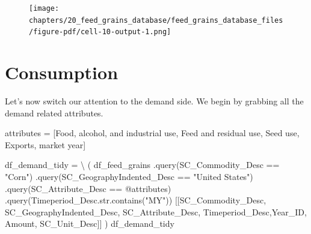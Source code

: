\documentclass[
  letterpaper,
  DIV=11,
  numbers=noendperiod]{scrreprt}
\newenvironment{Shaded}{\begin{snugshade}}{\end{snugshade}}
\newcommand{\NormalTok}[1]{\textcolor[rgb]{0.00,0.23,0.31}{#1}}
\newcommand{\OperatorTok}[1]{\textcolor[rgb]{0.37,0.37,0.37}{#1}}
\newcommand{\StringTok}[1]{\textcolor[rgb]{0.13,0.47,0.30}{#1}}
\begin{document}
\begin{figure}[H]

{\centering \texttt{[image: chapters/20\_feed\_grains\_database/feed\_grains\_database\_files/figure-pdf/cell-10-output-1.png]}

}

\end{figure}

\hypertarget{consumption}{%
\section{Consumption}\label{consumption}}

Let's now switch our attention to the demand side. We begin by grabbing
all the demand related attributes.

\begin{Shaded}
\begin{Highlighting}[]
\NormalTok{attributes }\OperatorTok{=}\NormalTok{ [}\StringTok{\textquotesingle{}Food, alcohol, and industrial use\textquotesingle{}}\NormalTok{, }\StringTok{\textquotesingle{}Feed and residual use\textquotesingle{}}\NormalTok{, }\StringTok{\textquotesingle{}Seed use\textquotesingle{}}\NormalTok{, }\StringTok{\textquotesingle{}Exports, market year\textquotesingle{}}\NormalTok{]}

\NormalTok{df\_demand\_tidy }\OperatorTok{=} \OperatorTok{\textbackslash{}}
\NormalTok{    (}
\NormalTok{    df\_feed\_grains}
\NormalTok{        .query(}\StringTok{\textquotesingle{}SC\_Commodity\_Desc == "Corn"\textquotesingle{}}\NormalTok{)}
\NormalTok{        .query(}\StringTok{\textquotesingle{}SC\_GeographyIndented\_Desc == "United States"\textquotesingle{}}\NormalTok{)}
\NormalTok{        .query(}\StringTok{\textquotesingle{}SC\_Attribute\_Desc == @attributes\textquotesingle{}}\NormalTok{)}
\NormalTok{        .query(}\StringTok{\textquotesingle{}Timeperiod\_Desc.str.contains("MY")\textquotesingle{}}\NormalTok{)}
\NormalTok{        [[}\StringTok{\textquotesingle{}SC\_Commodity\_Desc\textquotesingle{}}\NormalTok{, }\StringTok{\textquotesingle{}SC\_GeographyIndented\_Desc\textquotesingle{}}\NormalTok{, }\StringTok{\textquotesingle{}SC\_Attribute\_Desc\textquotesingle{}}\NormalTok{, }\StringTok{\textquotesingle{}Timeperiod\_Desc\textquotesingle{}}\NormalTok{,}\StringTok{\textquotesingle{}Year\_ID\textquotesingle{}}\NormalTok{, }\StringTok{\textquotesingle{}Amount\textquotesingle{}}\NormalTok{, }\StringTok{\textquotesingle{}SC\_Unit\_Desc\textquotesingle{}}\NormalTok{]]}
\NormalTok{    )}
\NormalTok{df\_demand\_tidy}
\end{Highlighting}
\end{Shaded}
\end{document}
